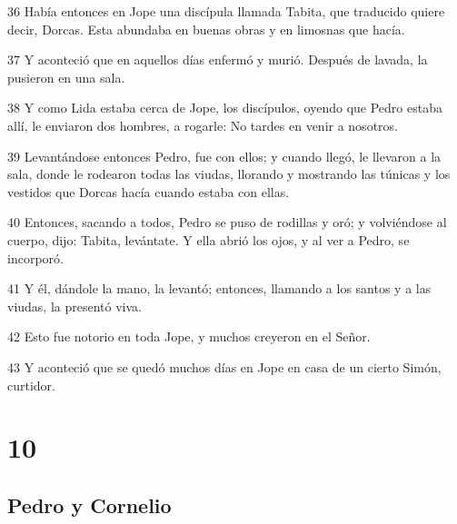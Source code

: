 \par 36 Había entonces en Jope una discípula llamada Tabita, que traducido quiere decir, Dorcas. Esta abundaba en buenas obras y en limosnas que hacía.
\par 37 Y aconteció que en aquellos días enfermó y murió. Después de lavada, la pusieron en una sala.
\par 38 Y como Lida estaba cerca de Jope, los discípulos, oyendo que Pedro estaba allí, le enviaron dos hombres, a rogarle: No tardes en venir a nosotros.
\par 39 Levantándose entonces Pedro, fue con ellos; y cuando llegó, le llevaron a la sala, donde le rodearon todas las viudas, llorando y mostrando las túnicas y los vestidos que Dorcas hacía cuando estaba con ellas.
\par 40 Entonces, sacando a todos, Pedro se puso de rodillas y oró; y volviéndose al cuerpo, dijo: Tabita, levántate. Y ella abrió los ojos, y al ver a Pedro, se incorporó.
\par 41 Y él, dándole la mano, la levantó; entonces, llamando a los santos y a las viudas, la presentó viva.
\par 42 Esto fue notorio en toda Jope, y muchos creyeron en el Señor.
\par 43 Y aconteció que se quedó muchos días en Jope en casa de un cierto Simón, curtidor.

\chapter{10}

\section*{Pedro y Cornelio}

